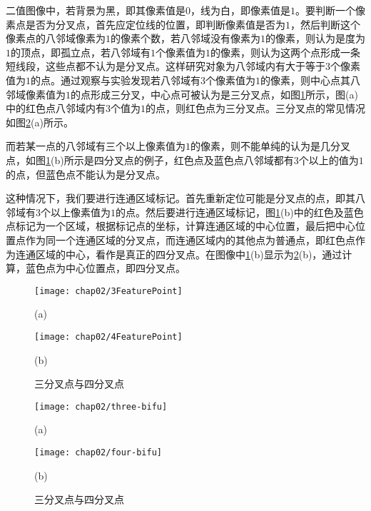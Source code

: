 二值图像中，若背景为黑，即其像素值是$0$，线为白，即像素值是$1$。要判断一个像素点是否为分叉点，首先应定位线的位置，即判断像素值是否为$1$，然后判断这个像素点的八邻域像素为$1$的像素个数，若八邻域没有像素为$1$的像素，则认为是度为$1$的顶点，即孤立点，若八邻域有$1$个像素值为$1$的像素，则认为这两个点形成一条短线段，这些点都不认为是分叉点。这样研究对象为八邻域内有大于等于$3$个像素值为$1$的点。通过观察与实验发现若八邻域有$3$个像素值为$1$的像素，则中心点其八邻域像素值为$1$的点形成三分叉，中心点可被认为是三分叉点，如图\ref{fig:FeaturePoints}所示，图(a)中的红色点八邻域内有$3$个值为$1$的点，则红色点为三分叉点。三分叉点的常见情况如图\ref{fig:FeaturePoints-image}(a)所示。

而若某一点的八邻域有三个以上像素值为$1$的像素，则不能单纯的认为是几分叉点，如图\ref{fig:FeaturePoints}(b)所示是四分叉点的例子，红色点及蓝色点八邻域都有$3$个以上的值为$1$的点，但蓝色点不能认为是分叉点。

这种情况下，我们要进行连通区域标记。首先重新定位可能是分叉点的点，即其八邻域有$3$个以上像素值为$1$的点。然后要进行连通区域标记，图\ref{fig:FeaturePoints}(b)中的红色及蓝色点标记为一个区域，根据标记点的坐标，计算连通区域的中心位置，最后把中心位置点作为同一个连通区域的分叉点，而连通区域内的其他点为普通点，即红色点作为连通区域的中心，看作是真正的四分叉点。在图像中\ref{fig:FeaturePoints}(b)显示为\ref{fig:FeaturePoints-image}(b)，通过计算，蓝色点为中心位置点，即四分叉点。

\begin{figure}
\centering
  \begin{minipage}[b]{0.48\textwidth} 
      \centering 
      \texttt{[image: chap02/3FeaturePoint]}
        \centerline{(a)}\medskip
	 \label{fig:3FeaturePoint}
    \end{minipage}
  \begin{minipage}[b]{0.48\textwidth}
    \centering
    \texttt{[image: chap02/4FeaturePoint]}
      \centerline{(b)}\medskip
	\label{fig:4FeaturePoint}
  \end{minipage}
\caption{三分叉点与四分叉点}
\label{fig:FeaturePoints}
\end{figure}

\begin{figure}
\centering
  \begin{minipage}[b]{1\textwidth} 
      \centering 
      \texttt{[image: chap02/three-bifu]}
        \centerline{(a)}\medskip
    \end{minipage}
  \begin{minipage}[b]{1\textwidth}
    \centering
    \texttt{[image: chap02/four-bifu]}
      \centerline{(b)}\medskip
  \end{minipage}
\caption{三分叉点与四分叉点}
\label{fig:FeaturePoints-image}
\end{figure}

